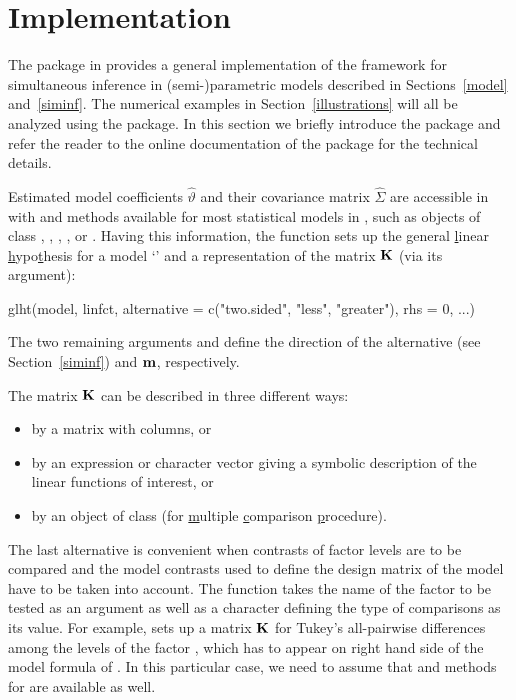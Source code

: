 \documentclass[12pt]{article}
\begin{document}
\section{Implementation} \label{implementation}

The  package \citep{pkg:multcomp} in \RR{} \citep{R2007} provides
a general implementation of the framework for simultaneous inference in
(semi-)\-parametric models described in Sections~\ref{model} and~\ref{siminf}.
The numerical examples in Section~\ref{illustrations}
will all be analyzed using the  package. In this section 
we briefly introduce the
 package and refer the reader to the online documentation 
of the package for the technical details.

Estimated model coefficients $\hat{\vartheta}$ and their covariance
matrix $\hat{\Sigma}$ are accessible in \RR{} with 
and  methods available for most statistical models in \RR, such as
objects of class ,
, , , or .
Having this information, the  function sets up the \underline{g}eneral
\underline{l}inear \underline{h}ypo\underline{t}hesis for a model
`' and a representation of the matrix $\mathbf{K}$ (via its
 argument):
\begin{Sinput}
glht(model, linfct, alternative = c("two.sided", "less", "greater"),
     rhs = 0, ...)
\end{Sinput}
The two remaining arguments
 and  define the direction
of the alternative (see Section~\ref{siminf}) and $\mathbf{m}$, respectively.

The matrix $\mathbf{K}$ can be described in three different ways:
\begin{itemize}
\item by a matrix with  columns, or
\item by an expression or character vector giving a symbolic description
      of the linear functions of interest, or
\item by an object of class 
      (for \underline{m}ultiple \underline{c}omparison \underline{p}rocedure).
\end{itemize}
The last alternative is convenient when contrasts of factor levels are
to be compared and the model contrasts used to define the design matrix
of the model have to be taken into account. The  function
takes the name of the factor to be tested as an argument as well as a character
defining the type of comparisons as its value. For example,
 sets up a matrix $\mathbf{K}$ for Tukey's all-pairwise
differences among the levels of the factor ,
which has to appear on right hand side of the model formula
of . In this particular case, we need to assume
that  and  methods for
 are available as well.
\end{document}
